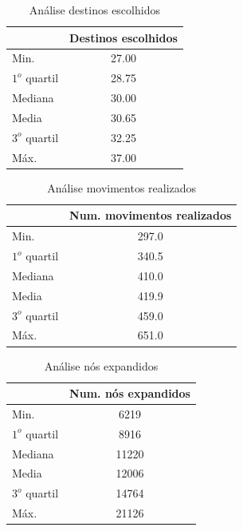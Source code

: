 \documentclass[12pt]{article}
\begin{document}
\begin{table}[h]
	\centering
	\begin{tabular}{|l|c|}
	\hline
	& Destinos escolhidos \\ \hline
	Min. & 27.00 \\ \hline
	$1^{o}$ quartil & 28.75 \\ \hline
	Mediana & 30.00 \\ \hline
	Media & 30.65 \\ \hline
	$3^{o}$ quartil & 32.25 \\ \hline
	Máx. & 37.00 \\ \hline
	\end{tabular}
	\caption{Análise destinos escolhidos}
	\label{tabela:destinos}
\end{table}


\begin{table}[h]
	\centering
	\begin{tabular}{|l|c|}
	\hline
	& Num. movimentos realizados \\ \hline
	Min. & 297.0 \\ \hline
	$1^{o}$ quartil & 340.5 \\ \hline
	Mediana & 410.0 \\ \hline
	Media & 419.9 \\ \hline
	$3^{o}$ quartil & 459.0 \\ \hline
	Máx. & 651.0 \\ \hline
	\end{tabular}
	\caption{Análise movimentos realizados}
	\label{tabela:movimentos}
\end{table}


\begin{table}[h]
	\centering
	\begin{tabular}{|l|c|}
	\hline
	& Num. nós expandidos \\ \hline
	Min. & 6219 \\ \hline
	$1^{o}$ quartil & 8916 \\ \hline
	Mediana & 11220 \\ \hline
	Media & 12006 \\ \hline
	$3^{o}$ quartil & 14764 \\ \hline
	Máx. & 21126 \\ \hline
	\end{tabular}
	\caption{Análise nós expandidos}
	\label{tabela:nosExpandidos}
\end{table}
\end{document}
